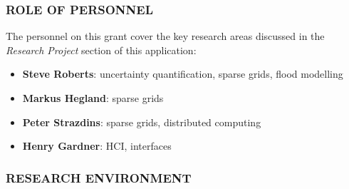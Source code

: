\documentclass[a4paper,fontsize=12pt]{scrartcl}
\begin{document}


\subsubsection*{ROLE OF PERSONNEL}

The personnel on this grant cover the key research areas discussed in
the \emph{Research Project} section of this application:

\begin{itemize}
\item \textbf{Steve Roberts}: uncertainty quantification, sparse grids, flood
  modelling
\item \textbf{Markus Hegland}: sparse grids
\item \textbf{Peter Strazdins}: sparse grids, distributed computing
\item \textbf{Henry Gardner}: HCI, interfaces
\end{itemize}

\subsubsection*{RESEARCH ENVIRONMENT}
\end{document}
